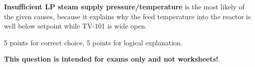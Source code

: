 \filbreak







{\bf Insufficient LP steam supply pressure/temperature} is the most likely of the given causes, because it explains why the feed temperature into the reactor is well below setpoint while TV-101 is wide open.

\vskip 10pt

5 points for correct choice, 5 points for logical explanation.







{\bf This question is intended for exams only and not worksheets!}.



